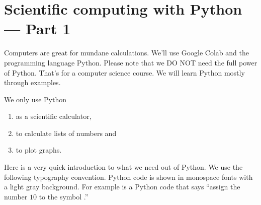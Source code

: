 \documentclass[../main.tex]{subfiles}
\begin{document}
 \section{Scientific computing with Python --- Part 1}

Computers are great for mundane calculations. We'll use Google Colab and the programming language Python. Please note that we DO NOT need the full power of Python. That's for a computer science course.  We will learn Python mostly through examples. 

We only use Python 
\begin{enumerate}
  \item as a scientific calculator,
  \item to calculate lists of numbers and
  \item to plot graphs.
\end{enumerate}

Here is a very quick introduction to what we need out of Python.  We use the following typography convention. Python code is shown in monospace fonts with a light gray background. For example  is a Python code that says ``assign the number \(10\) to the symbol .''
\end{document}
